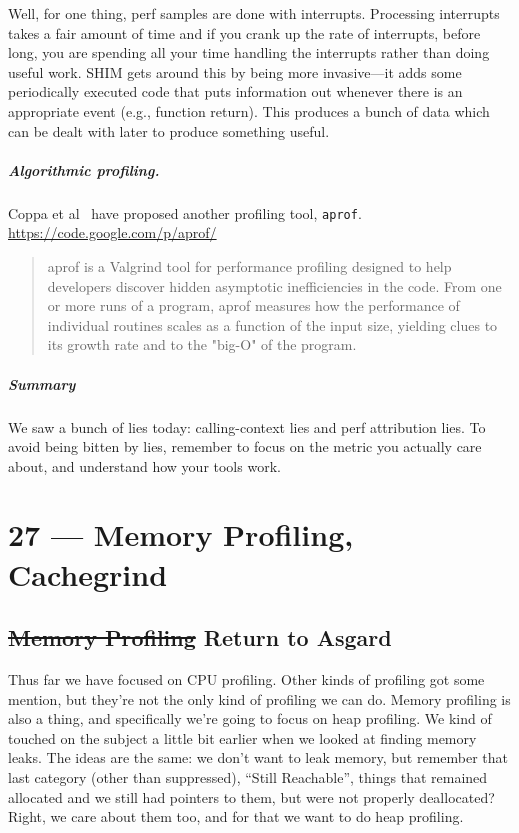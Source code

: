 \documentclass[a4paper]{report}
\begin{document}
Well, for one thing, perf samples are done with interrupts. Processing interrupts takes a fair amount of time and if you crank up the rate of interrupts, before long, you are spending all your time handling the interrupts rather than doing useful work. SHIM gets around this by being more invasive---it adds some periodically executed code that puts information out whenever there is an appropriate event (e.g., function return). This produces a bunch of data which can be dealt with later to produce something useful.

  \paragraph{Algorithmic profiling.} Coppa et al~\cite{coppa2014input} have proposed another profiling tool,
  {\tt aprof}.
  \url{https://code.google.com/p/aprof/}
{
  \begin{quote}
  aprof is a Valgrind tool for performance profiling designed to help developers discover hidden asymptotic inefficiencies in the code. From one or more runs of a program, aprof measures how the performance of individual routines scales as a function of the input size, yielding clues to its growth rate and to the "big-O" of the program.
  \end{quote}
  }

\paragraph{Summary} We saw a bunch of lies today: calling-context lies and perf attribution
lies. To avoid being bitten by lies, remember to focus on the metric you actually care about,
and understand how your tools work.










\chapter*{27 --- Memory Profiling, Cachegrind}


\section*{\st{Memory Profiling} Return to Asgard}

Thus far we have focused on CPU profiling. Other kinds of profiling got some mention, but they're not the only kind of profiling we can do. Memory profiling is also a thing, and specifically we're going to focus on heap profiling. We kind of touched on the subject a little bit earlier when we looked at finding memory leaks. The ideas are the same: we don't want to leak memory, but remember that last category (other than suppressed), ``Still Reachable'', things that remained allocated and we still had pointers to them, but were not properly deallocated? Right, we care about them too, and for that we want to do heap profiling.
\end{document}
